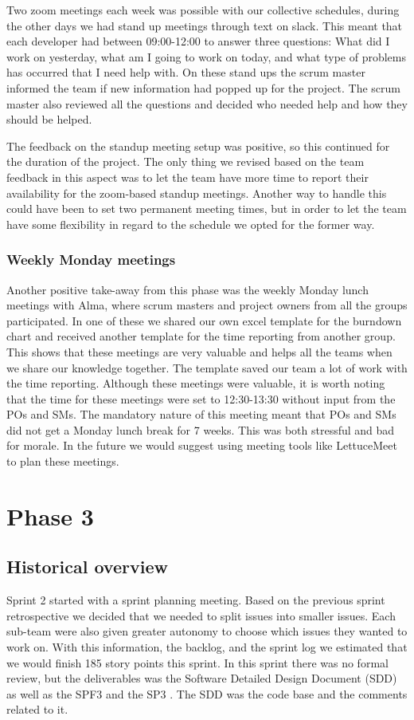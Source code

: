 \documentclass{article}
\begin{document}
Two zoom meetings each week was possible with our collective schedules, during the other days we had stand up meetings through text on slack. This meant that each developer had between 09:00-12:00 to answer three questions: What did I work on yesterday, what am I going to work on today, and what type of problems has occurred that I need help with. On these stand ups the scrum master informed the team if new information had popped up for the project. The scrum master also reviewed all the questions and decided who needed help and how they should be helped. 

The feedback on the standup meeting setup was positive, so this continued for the duration of the project. The only thing we revised based on the team feedback in this aspect was to let the team have more time to report their availability for the zoom-based standup meetings. Another way to handle this could have been to set two permanent meeting times, but in order to let the team have some flexibility in regard to the schedule we opted for the former way. 

\subsubsection{Weekly Monday meetings}
Another positive take-away from this phase was the weekly Monday lunch meetings with Alma, where scrum masters and project owners from all the groups participated. In one of these we shared our own excel template for the burndown chart and received another template for the time reporting from another group. This shows that these meetings are very valuable and helps all the teams when we share our knowledge together. The template saved our team a lot of work with the time reporting. Although these meetings were valuable, it is worth noting that the time for these meetings were set to 12:30-13:30 without input from the POs and SMs. The mandatory nature of this meeting meant that POs and SMs did not get a Monday lunch break for 7 weeks. This was both stressful and bad for morale. In the future we would suggest using meeting tools like LettuceMeet to plan these meetings.

\section{Phase 3} %
\subsection{Historical overview}
Sprint 2 started with a sprint planning meeting. Based on the previous sprint retrospective we decided that we needed to split issues into smaller issues. Each sub-team were also given greater autonomy to choose which issues they wanted to work on. With this information, the backlog, and the sprint log we estimated that we would finish 185 story points this sprint. In this sprint there was no formal review, but the deliverables was the Software Detailed Design Document (SDD) as well as the SPF3 \cite{SPF3} and the SP3 \cite{SP3}. The SDD was the code base and the comments related to it.  
\end{document}
